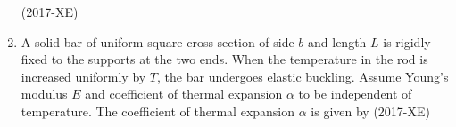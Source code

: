 \documentclass[journal]{IEEEtran}
\begin{document}
\begin{enumerate}
\hfill(2017-XE)

\begin{enumerate}
\end{enumerate}
\item A solid bar of uniform square cross-section of side $b$ and length $L$ is rigidly fixed to the supports at the two ends. When the temperature in the rod is increased uniformly by $T$, the bar undergoes elastic buckling. Assume Young's modulus $E$ and coefficient of thermal expansion $\alpha$ to be independent of temperature. The coefficient of thermal expansion $\alpha$ is given by \hfill(2017-XE)
\begin{enumerate}
\end{enumerate}
\end{enumerate}
\end{document}
